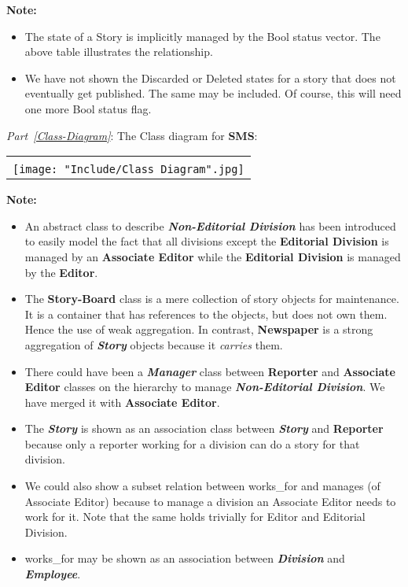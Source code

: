 \documentclass{article}
\begin{document}
{\bf Note:}
\begin{itemize}
\item The state of a Story is implicitly managed by the Bool status vector. The above table illustrates the relationship.
\item We have not shown the Discarded or Deleted states for a story that does not eventually get published. The same may be included. Of course, this will need one more Bool status flag.
\end{itemize} 

\newpage
{\em Part~\ref{Class-Diagram}}: The Class diagram for {\bf SMS}:

\begin{center}
\begin{tabular}{|l|} \hline
\\ 
\texttt{[image: "Include/Class Diagram".jpg]} \\ \hline
\end{tabular}
\end{center}

{\bf Note:}
\begin{itemize}
\item An abstract class to describe {\bf \em Non-Editorial Division} has been introduced to easily model the fact that all divisions except the {\bf Editorial Division} is managed by an {\bf Associate Editor} while the {\bf Editorial Division} is managed by the {\bf Editor}.

\item The {\bf Story-Board} class is a mere collection of story objects for maintenance. It is a container that has references to the objects, but does not own them. Hence the use of weak aggregation. In contrast, {\bf Newspaper} is a strong aggregation of {\bf \em Story} objects because it {\em carries} them.

\item There could have been a {\bf \em Manager} class between {\bf Reporter} and {\bf Associate Editor} classes on the hierarchy to manage {\bf \em Non-Editorial Division}. We have merged it with {\bf Associate Editor}.

\item The {\bf \em Story} is shown as an association class between {\bf \em Story} and {\bf Reporter} because only a reporter working for a division can do a story for that division.

\item We could also show a subset relation between \textsf{works\_for} and \textsf{manages} (of Associate Editor) because to manage a division an Associate Editor needs to work for it. Note that the same holds trivially for Editor and Editorial Division.

\item \textsf{works\_for} may be shown as an association between {\bf \em Division} and {\bf \em Employee}.
\end{itemize} 
\end{document}

